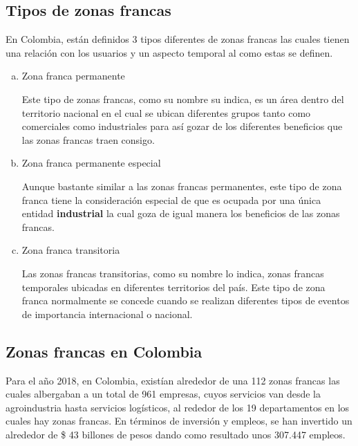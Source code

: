\documentclass[10pt]{article}
\begin{document}
    \subsection{Tipos de zonas francas}

    En Colombia, están definidos 3 tipos diferentes de zonas francas las cuales tienen una relación con los usuarios y un aspecto temporal al como estas se definen.

    \begin{enumerate}[a)]
        \item {Zona franca permanente}
        
        Este tipo de zonas francas, como su nombre su indica, es un área dentro del territorio nacional en el cual se ubican diferentes grupos tanto como comerciales como industriales para así gozar de los diferentes beneficios que las zonas francas traen consigo.
        
        \item {Zona franca permanente especial}
        
        Aunque bastante similar a las zonas francas permanentes, este tipo de zona franca tiene la consideración especial de que es ocupada por una única entidad \textbf{industrial} la cual goza de igual manera los beneficios de las zonas francas. 
        
        \item {Zona franca transitoria}
        
        Las zonas francas transitorias, como su nombre lo indica, zonas francas temporales ubicadas en diferentes territorios del país. Este tipo de zona franca normalmente se concede cuando se realizan diferentes tipos de eventos de importancia internacional o nacional.
        
    \end{enumerate}
        
    \subsection{Zonas francas en Colombia}
    
    Para el año 2018, en Colombia, existían alrededor de una 112 zonas francas las cuales albergaban a un total de 961 empresas, cuyos servicios van desde la agroindustria hasta servicios logísticos, al rededor de los 19 departamentos en los cuales hay zonas francas. En términos de inversión y empleos, se han invertido un alrededor de \$ 43 billones de pesos dando como resultado unos 307.447 empleos. 
\end{document}
